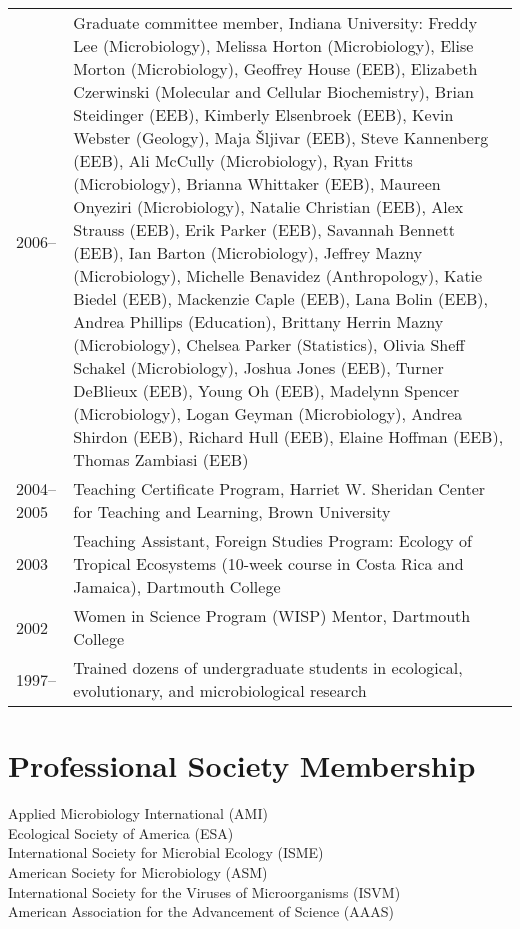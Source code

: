 \documentclass[11pt]{article}
\begin{document}
\begin{longtable}{@{}p{4em}@{\hspace{2em}}p{}@{}}
2006-- & Graduate committee member, Indiana University: Freddy Lee (Microbiology), Melissa Horton (Microbiology), Elise Morton (Microbiology), Geoffrey House (EEB), Elizabeth Czerwinski (Molecular and Cellular Biochemistry), Brian Steidinger (EEB), Kimberly Elsenbroek (EEB), Kevin Webster (Geology), Maja Šljivar (EEB), Steve Kannenberg (EEB), Ali McCully (Microbiology), Ryan Fritts (Microbiology), Brianna Whittaker (EEB), Maureen Onyeziri (Microbiology), Natalie Christian (EEB), Alex Strauss (EEB), Erik Parker (EEB), Savannah Bennett (EEB), Ian Barton (Microbiology), Jeffrey Mazny (Microbiology), Michelle Benavidez (Anthropology), Katie Biedel (EEB), Mackenzie Caple (EEB), Lana Bolin (EEB), Andrea Phillips (Education), Brittany Herrin Mazny (Microbiology), Chelsea Parker (Statistics), Olivia Sheff Schakel (Microbiology), Joshua Jones (EEB), Turner DeBlieux (EEB), Young Oh (EEB), Madelynn Spencer (Microbiology), Logan Geyman (Microbiology), Andrea Shirdon (EEB), Richard Hull (EEB), Elaine Hoffman (EEB), Thomas Zambiasi (EEB) \\

2004--2005 & Teaching Certificate Program, Harriet W. Sheridan Center for Teaching and Learning, Brown University \\

2003       & Teaching Assistant, Foreign Studies Program: Ecology of Tropical Ecosystems (10-week course in Costa Rica and Jamaica), Dartmouth College \\

2002       & Women in Science Program (WISP) Mentor, Dartmouth College \\

1997--     & Trained dozens of undergraduate students in ecological, evolutionary, and microbiological research \\
\end{longtable}

\section*{Professional Society Membership}
\vspace{-0.5em}
\noindent Applied Microbiology International (AMI)\\[0.5em]
\noindent Ecological Society of America (ESA)\\[0.5em]
\noindent International Society for Microbial Ecology (ISME)\\[0.5em]
\noindent American Society for Microbiology (ASM)\\[0.5em]
\noindent International Society for the Viruses of Microorganisms (ISVM)\\[0.5em]
\noindent American Association for the Advancement of Science (AAAS)\\
\end{document}
